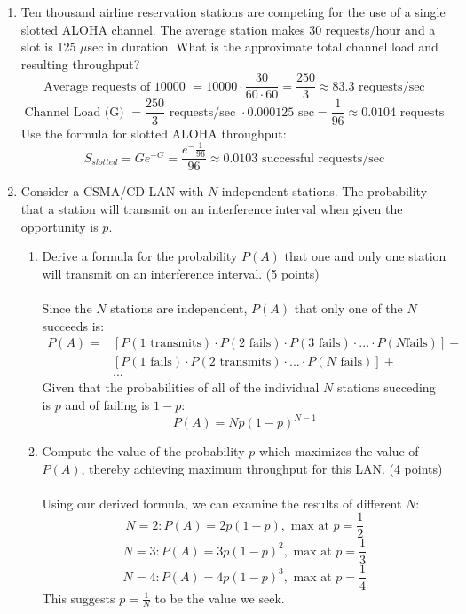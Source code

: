 \documentclass[12pt]{article}
\begin{document}
\begin{enumerate}
\newpage

\item Ten thousand airline reservation stations are competing for the use of a single slotted ALOHA channel. The average station makes 30 requests/hour and a slot is 125 $\mu$sec in duration.  What is the approximate total channel load and resulting throughput? \\
  \[ \text{Average requests of 10000 } = 10000 \cdot \frac{30}{60\cdot 60} = \frac{250}{3} \approx 83.3 \text{ requests/sec} \]
  \[ \text{Channel Load (G) } = \frac{250}{3} \text{ requests/sec }\cdot 0.000125 \text{ sec} = \frac{1}{96} \approx 0.0104 \text{ requests} \]
  Use the formula for slotted ALOHA throughput:
  \[ S_{slotted} = Ge^{-G} = \frac{e^-\frac{1}{96}}{96} \approx 0.0103 \text{ successful requests/sec}\]

\newpage

\item Consider a CSMA/CD LAN with $N$ independent stations. The probability that a station will transmit on an interference interval when given the opportunity is $p$.
  \begin{enumerate}
    \item Derive a formula for the probability $P(A)$ that one and only one station will transmit on an interference interval. (5 points) \\ \\
     Since the $N$ stations are independent, $P(A)$ that only one of the $N$ succeeds is: 
     \begin{align*}
     P(A) = &[P(1 \text{ transmits}) \cdot P(2 \text{ fails}) \cdot P(3 \text{ fails}) \cdot ... \cdot P(N \text {fails})]  +\\
       &[P(1 \text{ fails}) \cdot P(2 \text{ transmits}) \cdot ... \cdot P(N \text{ fails})]  +\\
       & ...         
     \end{align*}
     Given that the probabilities of all of the individual $N$ stations succeding is $p$ and of failing is $1-p$:
     \[ P(A) = Np(1-p)^{N-1} \]

    \item Compute the value of the probability $p$ which maximizes the value of $P(A)$, thereby achieving maximum throughput for this LAN. (4 points) \\ \\
      Using our derived formula, we can examine the results of different $N$:
      \[ N = 2: P(A) = 2p(1-p), \text{ max at } p = \frac{1}{2} \]
      \[ N = 3: P(A) = 3p(1-p)^2, \text{ max at } p = \frac{1}{3} \]
      \[ N = 4: P(A) = 4p(1-p)^3, \text{ max at } p = \frac{1}{4} \]
      This suggests $p = \frac{1}{N}$ to be the value we seek.
    \end{enumerate}


\end{enumerate}
\end{document}
